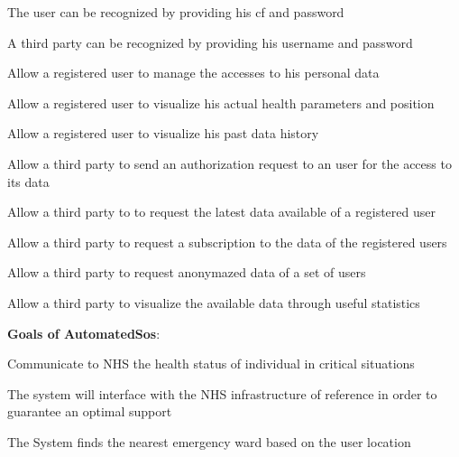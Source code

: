 \begin{goalList}
\begin{enumerate}[label={[}G 1.\arabic*{]}]
\item \label{goal:user0}The user can be recognized by providing his cf and password
\item \label{goal:user00}A third party can be recognized by providing his username and password

    \item \label{goal:user1} Allow a registered user to manage the accesses to his personal data
    \item \label{goal:user2}Allow a registered user to visualize his actual health parameters and position
    \item \label{goal:user3}Allow a registered user to visualize his past data history
    
     \item \label{goal:parties1}Allow a third party to send an authorization request to an user for the access to its data
     \item \label{goal:parties2}Allow a third party to to request the latest data available of a registered user
 
    \item \label{goal:parties3}Allow a third party to request a subscription to the data of the registered users
    
    \item \label{goal:parties4}Allow a third party to request anonymazed data of a set of users 
    
    \item \label{goal:parties5}Allow a third party to visualize the available data through useful statistics 


\end{enumerate}
\textbf{Goals of AutomatedSos}:
\begin{enumerate}[label={[}G 2.\arabic*{]}]

\item \label{goal:sos1}Communicate to NHS the health status of individual in critical situations
\item \label{goal:sos2}
The system will interface with the NHS infrastructure of reference in order to guarantee an optimal support
\item \label{goal:sos3}The System finds the nearest emergency ward based on the user location

\end{enumerate}
\newpage


\end{goalList}
